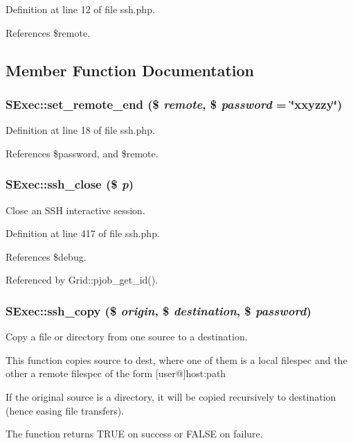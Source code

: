 Definition at line 12 of file ssh.php.

References \$remote.

\subsection{Member Function Documentation}
\subsubsection{\setlength{\rightskip}{0pt plus 5cm}SExec::set\_\-remote\_\-end (\$ {\em remote}, \$ {\em password} = \char`\"{}xxyzzy\char`\"{})}\label{classSExec_a1}




Definition at line 18 of file ssh.php.

References \$password, and \$remote.
\subsubsection{\setlength{\rightskip}{0pt plus 5cm}SExec::ssh\_\-close (\$ {\em p})}\label{classSExec_a7}


Close an SSH interactive session. 



Definition at line 417 of file ssh.php.

References \$debug.

Referenced by Grid::pjob\_\-get\_\-id().
\subsubsection{\setlength{\rightskip}{0pt plus 5cm}SExec::ssh\_\-copy (\$ {\em origin}, \$ {\em destination}, \$ {\em password})}\label{classSExec_a4}


Copy a file or directory from one source to a destination. 

This function copies source to dest, where one of them is a local filespec and the other a remote filespec of the form [user@]host:path

If the original source is a directory, it will be copied recursively to destination (hence easing file transfers).

The function returns TRUE on success or FALSE on failure.

